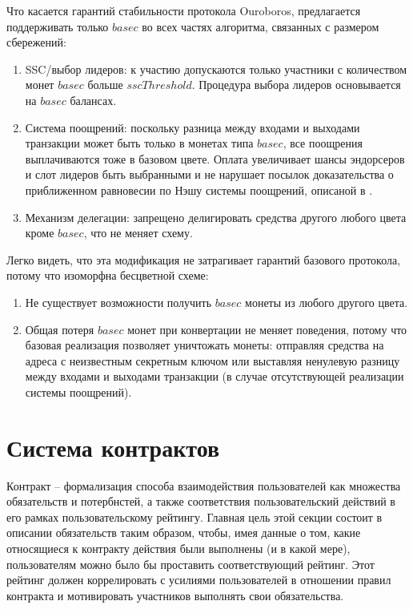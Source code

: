 \documentclass[specification,annotation]{itmo-student-thesis}
\begin{document}
Что касается гарантий стабильности протокола Ouroboros, предлагается
поддерживать только $basec$ во всех частях алгоритма, связанных с
размером сбережений:

\begin{enumerate}
\item SSC/выбор лидеров: к участию допускаются только участники с
  количеством монет $basec$ больше $sscThreshold$. Процедура выбора
  лидеров основывается на $basec$ балансах.
\item Система поощрений: поскольку разница между входами и выходами
  транзакции может быть только в монетах типа $basec$, все поощрения
  выплачиваются тоже в базовом цвете. Оплата увеличивает шансы
  эндорсеров и слот лидеров быть выбранными и не нарушает посылок
  доказательства о приближенном равновесии по Нэшу системы поощрений,
  описаной в \cite{ouroboros}.
\item Механизм делегации: запрещено делигировать средства другого
  любого цвета кроме $basec$, что не меняет схему.
\end{enumerate}

Легко видеть, что эта модификация не затрагивает гарантий базового
протокола, потому что изоморфна бесцветной схеме:

\begin{enumerate}
\item Не существует возможности получить $basec$ монеты из любого
  другого цвета.
\item Общая потеря $basec$ монет при конвертации не меняет поведения,
  потому что базовая реализация позволяет уничтожать монеты: отправляя
  средства на адреса с неизвестным секретным ключом или выставляя
  ненулевую разницу между входами и выходами транзакции (в случае
  отсутствующей реализации системы поощрений).
\end{enumerate}

\section{Система контрактов}

Контракт -- формализация способа взаимодействия пользователей как
множества обязательств и потербнстей, а также соответствия
пользовательский действий в его рамках пользовательскому
рейтингу. Главная цель этой секции состоит в описании обязательств
таким образом, чтобы, имея данные о том, какие относящиеся к контракту
действия были выполнены (и в какой мере), пользователям можно было бы
проставить соответствующий рейтинг. Этот рейтинг должен коррелировать
с усилиями пользователей в отношении правил контракта и мотивировать
участников выполнять свои обязательства.
\end{document}
